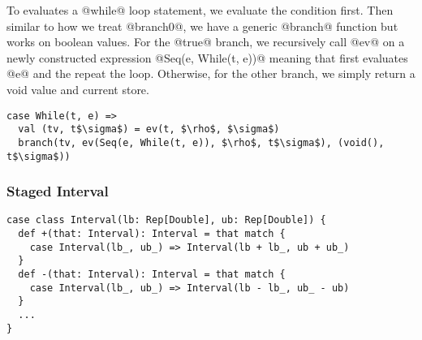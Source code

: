To evaluates a @while@ loop statement, we evaluate the condition first.
Then similar to how we treat @branch0@, we have a generic @branch@ function but works on boolean
values. For the @true@ branch, we recursively call @ev@ on a newly constructed expression
@Seq(e, While(t, e))@ meaning that first evaluates @e@ and the repeat the loop.
Otherwise, for the other branch, we simply return a void value and current store.

\begin{lstlisting}
case While(t, e) =>
  val (tv, t$\sigma$) = ev(t, $\rho$, $\sigma$)
  branch(tv, ev(Seq(e, While(t, e)), $\rho$, t$\sigma$), (void(), t$\sigma$))
\end{lstlisting}

\subsubsection{Staged Interval}

\begin{lstlisting}
case class Interval(lb: Rep[Double], ub: Rep[Double]) {
  def +(that: Interval): Interval = that match {
    case Interval(lb_, ub_) => Interval(lb + lb_, ub + ub_)
  }
  def -(that: Interval): Interval = that match {
    case Interval(lb_, ub_) => Interval(lb - lb_, ub_ - ub) 
  }
  ...
}
\end{lstlisting}


